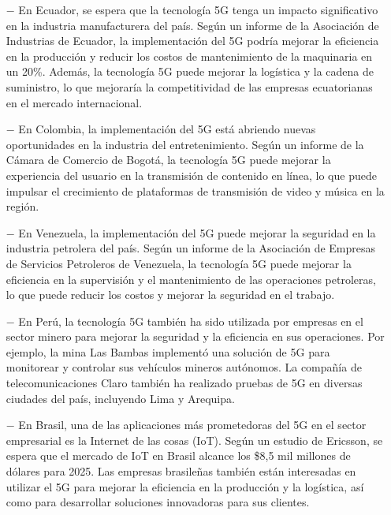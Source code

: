 \documentclass[12pt]{article}
\begin{document}
            \begin{itemize}
                \item [$-$] En Ecuador, se espera que la tecnología 5G tenga un impacto significativo en la industria manufacturera del país. Según un informe de la Asociación de Industrias de Ecuador, la implementación del 5G podría mejorar la eficiencia en la producción y reducir los costos de mantenimiento de la maquinaria en un 20\%. Además, la tecnología 5G puede mejorar la logística y la cadena de suministro, lo que mejoraría la competitividad de las empresas ecuatorianas en el mercado internacional.
            
                \item [$-$] En Colombia, la implementación del 5G está abriendo nuevas oportunidades en la industria del entretenimiento. Según un informe de la Cámara de Comercio de Bogotá, la tecnología 5G puede mejorar la experiencia del usuario en la transmisión de contenido en línea, lo que puede impulsar el crecimiento de plataformas de transmisión de video y música en la región.
                
                \item [$-$] En Venezuela, la implementación del 5G puede mejorar la seguridad en la industria petrolera del país. Según un informe de la Asociación de Empresas de Servicios Petroleros de Venezuela, la tecnología 5G puede mejorar la eficiencia en la supervisión y el mantenimiento de las operaciones petroleras, lo que puede reducir los costos y mejorar la seguridad en el trabajo.
                
                \item [$-$] En Perú, la tecnología 5G también ha sido utilizada por empresas en el sector minero para mejorar la seguridad y la eficiencia en sus operaciones. Por ejemplo, la mina Las Bambas implementó una solución de 5G para monitorear y controlar sus vehículos mineros autónomos. La compañía de telecomunicaciones Claro también ha realizado pruebas de 5G en diversas ciudades del país, incluyendo Lima y Arequipa.
                
                \item [$-$] En Brasil, una de las aplicaciones más prometedoras del 5G en el sector empresarial es la Internet de las cosas (IoT). Según un estudio de Ericsson, se espera que el mercado de IoT en Brasil alcance los \$8,5 mil millones de dólares para 2025. Las empresas brasileñas también están interesadas en utilizar el 5G para mejorar la eficiencia en la producción y la logística, así como para desarrollar soluciones innovadoras para sus clientes.
                

\end{itemize}
\end{document}
